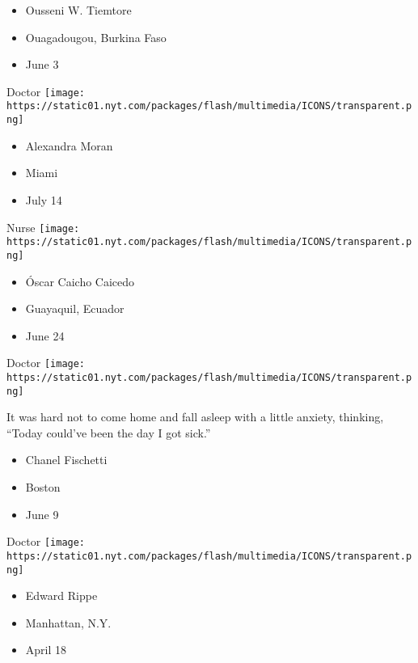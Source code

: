 \begin{itemize}
\tightlist
\item
  Ousseni W. Tiemtore
\item
  Ouagadougou, Burkina Faso
\item
  June 3
\end{itemize}

\protect\hyperlink{item-alexandra-moran}{}

Doctor
\texttt{[image: https://static01.nyt.com/packages/flash/multimedia/ICONS/transparent.png]}

\begin{itemize}
\tightlist
\item
  Alexandra Moran
\item
  Miami
\item
  July 14
\end{itemize}

\protect\hyperlink{item-oscar-caicho-caicedo}{}

Nurse
\texttt{[image: https://static01.nyt.com/packages/flash/multimedia/ICONS/transparent.png]}

\begin{itemize}
\tightlist
\item
  Óscar Caicho Caicedo
\item
  Guayaquil, Ecuador
\item
  June 24
\end{itemize}

\protect\hyperlink{item-chanel-fischetti}{}

Doctor
\texttt{[image: https://static01.nyt.com/packages/flash/multimedia/ICONS/transparent.png]}

It was hard not to come home and fall asleep with a little anxiety,
thinking, ``Today could've been the day I got sick.''

\begin{itemize}
\tightlist
\item
  Chanel Fischetti
\item
  Boston
\item
  June 9
\end{itemize}

\protect\hyperlink{item-edward-rippe}{}

Doctor
\texttt{[image: https://static01.nyt.com/packages/flash/multimedia/ICONS/transparent.png]}

\begin{itemize}
\tightlist
\item
  Edward Rippe
\item
  Manhattan, N.Y.
\item
  April 18
\end{itemize}


